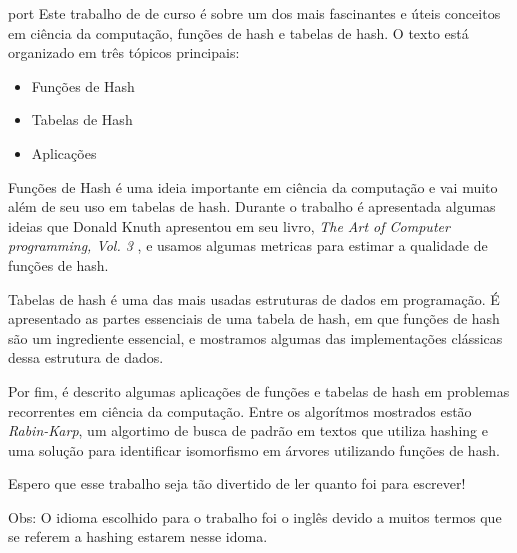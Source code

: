 \begin{resumo}{port}
  Este trabalho de  de curso é sobre um dos mais fascinantes e úteis conceitos em ciência da computação, funções de hash e tabelas de hash. O texto está organizado em três tópicos principais:

\begin{itemize}
  \item Funções de Hash
  \item Tabelas de Hash
  \item Aplicações
\end{itemize}

Funções de Hash é uma ideia importante em ciência da computação e vai muito além de seu uso em tabelas de hash. Durante o trabalho é apresentada algumas ideias que Donald Knuth apresentou em seu livro, \textit{The Art of Computer programming, Vol. 3} \citep{TAOCP3}, e usamos algumas metricas para estimar a qualidade de funções de hash.

Tabelas de hash é uma das mais usadas estruturas de dados em programação. É apresentado as partes essenciais de uma tabela de hash, em que funções de hash são um ingrediente essencial, e mostramos algumas das implementações clássicas dessa estrutura de dados.

Por fim, é descrito algumas aplicações de funções e tabelas de hash em problemas recorrentes em ciência da computação. Entre os algorítmos mostrados estão \textit{Rabin-Karp}, um algortimo de busca de padrão em textos que utiliza hashing e uma solução para identificar isomorfismo em árvores utilizando funções de hash.

Espero que esse trabalho seja tão divertido de ler quanto foi para escrever!

Obs: O idioma escolhido para o trabalho foi o inglês devido a muitos termos que se referem a hashing estarem nesse idoma. 

\end{resumo}

